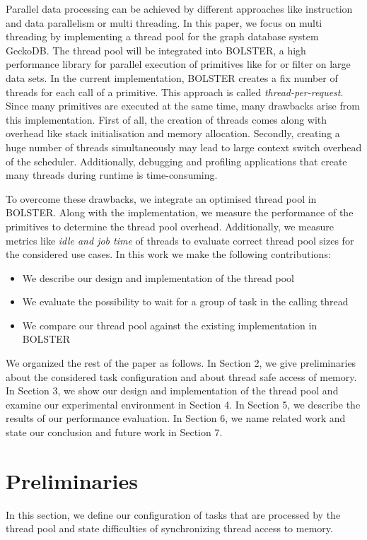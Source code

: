 \documentclass[conference]{IEEEtran}
\begin{document}
Parallel data processing can be achieved by different approaches like instruction and data parallelism or multi threading. In this paper, we focus on multi threading by implementing a thread pool for the graph database system GeckoDB. The thread pool will be integrated into BOLSTER, a high performance library for parallel execution of primitives like for or filter on large data sets. In the current implementation, BOLSTER creates a fix number of threads for each call of a primitive. This approach is called \emph{thread-per-request}. Since many primitives are executed at the same time, many drawbacks arise from this implementation. 
First of all, the creation of threads comes along with overhead like stack initialisation and memory allocation. Secondly, creating a huge number of threads simultaneously may lead to large context switch overhead of the scheduler. Additionally, debugging and profiling applications that create many threads during runtime is 	time-consuming.

To overcome these drawbacks, we integrate an optimised thread pool in BOLSTER. Along with the implementation, we measure the performance of the primitives to determine the thread pool overhead. Additionally, we measure metrics like \emph{idle and job time} of threads to evaluate correct thread pool sizes for the considered use cases.  In this work we make the following contributions:
\begin{itemize}
	\item We describe our design and implementation of the thread pool 
	\item We evaluate the possibility to wait for a group of task in the calling thread
	\item We compare our thread pool against the existing implementation in BOLSTER
\end{itemize}
We organized the rest of the paper as follows. In Section 2, we give preliminaries about the considered task configuration and about thread safe access of memory. In Section 3, we show our design and implementation of the thread pool and examine our experimental environment in Section 4. In Section 5, we describe the results of our performance evaluation. In Section 6, we name related work and state our conclusion and future work in Section 7.

\section{Preliminaries}
In this section, we define our configuration of tasks that are processed by the thread pool and state difficulties of synchronizing thread access to memory.
\end{document}

